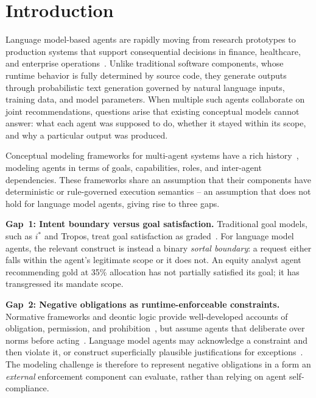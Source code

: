 \documentclass[runningheads]{llncs}
\begin{document}
\section{Introduction}
\label{sec:introduction}

Language model-based agents are rapidly moving from research prototypes to production systems that support consequential decisions in finance, healthcare, and enterprise operations~\cite{wang2024survey,xi2023rise}.
Unlike traditional software components, whose runtime behavior is fully determined by source code, they generate outputs through probabilistic text generation governed by natural language inputs, training data, and model parameters. When multiple such agents collaborate on joint recommendations, questions arise that existing conceptual models cannot answer: what each agent was supposed to do, whether it stayed within its scope, and why a particular output was produced.

Conceptual modeling frameworks for multi-agent systems have a rich history~\cite{yu2011social,bresciani2004tropos,wooldridge2000gaia}, modeling agents in terms of goals, capabilities, roles, and inter-agent dependencies. These frameworks share an assumption that their components have deterministic or rule-governed execution semantics -- an assumption that does not hold for language model agents, giving rise to three gaps.

\textbf{Gap~1: Intent boundary versus goal satisfaction.}
Traditional goal models, such as $i^*$ and Tropos, treat goal satisfaction as graded~\cite{yu2011social}. For language model agents, the relevant construct is instead a binary \emph{sortal boundary}: a request either falls within the agent's legitimate scope or it does not. An equity analyst agent recommending gold at 35\% allocation has not partially satisfied its goal; it has transgressed its mandate scope.

\textbf{Gap~2: Negative obligations as runtime-enforceable constraints.} Normative frameworks and deontic logic provide well-developed accounts of obligation, permission, and prohibition~\cite{vonwright1951essay,governatori2007characterising,boella2006introduction}, but assume agents that deliberate over norms before acting~\cite{dignum1999autonomous}. Language model agents may acknowledge a constraint and then violate it, or construct superficially plausible justifications for exceptions~\cite{huang2023selfcorrect}. The modeling challenge is therefore to represent negative obligations in a form an \emph{external} enforcement component can evaluate, rather than relying on agent self-compliance.
\end{document}
